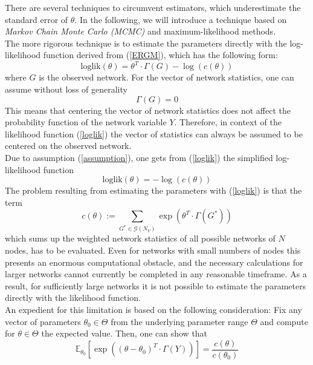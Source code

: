 \documentclass[10pt, conference, compsocconf]{IEEEtran}
\begin{document}
There are several techniques to circumvent estimators, which underestimate the standard error of $\theta$. In the following, we will introduce a technique based on \textit{Markov Chain Monte Carlo (MCMC)} and maximum-likelihood methods.\\[0.3cm]
The more rigorous technique is to estimate the parameters directly with the log-likelihood function derived from (\ref{ERGM}), which has the following form:
%
\begin{equation}
\text{loglik}(\theta)=\theta^T \cdot \Gamma(G)-\log(c(\theta))
\label{loglik}
\end{equation}
%
where $G$ is the observed network. For the vector of network statistics, one can assume without loss of generality
%
\begin{equation}
\Gamma(G)=0 \label{assumption}
\end{equation}
%
This means that centering the vector of network statistics does not affect the probability function of the network variable $Y$. Therefore, in context of the likelihood function (\ref{loglik}) the vector of statistics can always be assumed to be centered on the observed network.\\
Due to assumption (\ref{assumption}), one gets from (\ref{loglik}) the simplified log-likelihood function
%
\begin{equation}
\text{loglik}(\theta)= -\log(c(\theta))
\label{vloglik}
\end{equation}
%
The problem resulting from estimating the parameters with (\ref{loglik}) is that the term
%
$$c(\theta):= \sum_{G^* \in \mathcal{G}(N_V)} \exp(\theta^T \cdot \Gamma(G^*))$$ 
%
which sums up the weighted network statistics of all possible networks of $N$ nodes, has to be evaluated. Even for networks with small numbers of nodes this presents an enormous computational obstacle, and the necessary calculations for larger networks cannot currently be completed in any reasonable timeframe.
As a result, for sufficiently large networks it is not possible to estimate the parameters directly with the likelihood function.
\\[0.3cm]
An expedient for this limitation is based on the following consideration: Fix any vector of parameters $\theta_0 \in \Theta$ from the underlying parameter range $\Theta$ and compute for $\theta \in \Theta$ the expected value. Then, one can show that
%
\begin{equation*}
\mathbb{E}_{\theta_0}\left[ \exp\left((\theta - \theta_0)^T \cdot \Gamma(Y)\right) \right]=\frac{c(\theta)}{c(\theta_0)}
\end{equation*}
\end{document}
